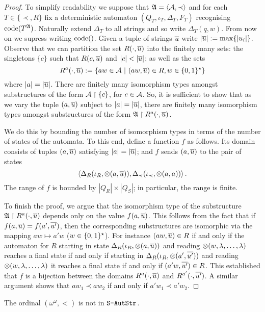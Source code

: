 \begin{proof}
To simplify readability we suppose that $\mathfrak{A} = \left<{\mathcal A}, \prec \right>$ and for each $T \in \{\prec,R\}$ fix a deterministic automaton  $(Q_T,\iota_T,\Delta_T,F_T)$ recognising ${\rm code}({T^{\mathfrak{A}}})$. Naturally extend $\Delta_T$ to all strings and so write
$\Delta_T(q,w)$. From now on we supress writing ${\rm code}({})$.
Given a tuple of strings $\mbox{$\overline {u}$}$ write $|\mbox{$\overline {u}$}| := \max\{|u_i|\}$. Observe that we can partition the set $R(\cdot,\mbox{$\overline {u}$})$
into the finitely many sets: the singletons $\{c\}$ such that $R(c,\mbox{$\overline {u}$})$ and  $|c| <
|\mbox{$\overline {u}$}|$; as well as the sets 
\[
R^{a}(\cdot,\mbox{$\overline {u}$}) := \{aw \in {\mathcal A} \ \vert \  (aw,\mbox{$\overline {u}$}) \in R, w \in \{0,1\}^\star\}
\]
where $|a| = |\mbox{$\overline {u}$}|$. There are finitely
many isomorphism types amongst substructures of the form ${{\mathcal A}} \restriction
\{c\}$, for $c \in {\mathcal A}$. So, it is sufficient to show that as we vary the tuple
$(a,\mbox{$\overline {u}$})$ subject to $|a| = |\mbox{$\overline {u}$}|$, there are finitely many isomorphism
types amongst substructures of the form $\mathfrak{A} \restriction R^{a }(\cdot,\mbox{$\overline {u}$})$.

We do this by bounding the number of isomorphism types in terms of the number
of states of the automata. To this end, define a function $f$ as
follows. Its domain consists of tuples $(a,\mbox{$\overline {u}$})$ satisfying $|a| = |\mbox{$\overline {u}$}|$; and $f$ sends $(a,\mbox{$\overline {u}$})$ to the pair of states
$$
\left<
\Delta_R(\iota_R,\otimes(a,\mbox{$\overline {u}$})),
\Delta_\prec(\iota_\prec,\otimes(a,a) ) \right>.
$$
The range of $f$ is bounded by $|Q_R| \times |Q_S|$; in particular, the range is finite.

To finish the proof, we argue that the isomorphism type of the
substructure $\mathfrak{A} \restriction R^{a }(\cdot,\mbox{$\overline {u}$})$ depends
only on the value $f(a,\mbox{$\overline {u}$})$. This follows from the fact that if
$f(a,\mbox{$\overline {u}$}) = f(a',\mbox{$\overline {u'}$})$, then the corresponding substructures
are isomorphic via the mapping $aw \mapsto a'w$ ($w \in \{0,1\}^\star$).
For instance $(aw,\mbox{$\overline {u}$}) \in R$ if and only if the automaton for $R$ starting in state
$\Delta_R(\iota_R,\otimes(a,\mbox{$\overline {u}$}))$ and reading $\otimes(w,\lambda,\dots,\lambda)$ reaches
a final state if and only if starting in $\Delta_R(\iota_R,\otimes(a',\mbox{$\overline {u'}$}))$ and reading $\otimes(w,\lambda,\dots,\lambda)$
it reaches a final state if and only if $(a'w,\mbox{$\overline {u'}$}) \in R$. This established that $f$ is a bijection between the domains
$R^{a}(\cdot,\mbox{$\overline {u}$})$ and $R^{a'}(\cdot,\mbox{$\overline {u'}$})$.
A similar argument shows that $aw_1 \prec aw_2$ if and only if $a'w_1 \prec a'w_2$.
\end{proof}


\begin{corollary}  \label{AS:cor:omom}
The ordinal $(\omega^\omega,<)$ is not in $\mbox{\tt S-AutStr}$.
\end{corollary}

